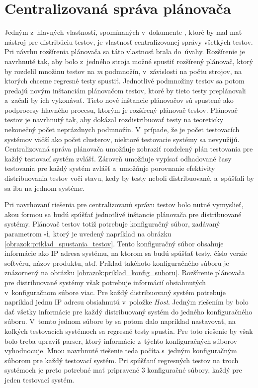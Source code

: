 \section{Centralizovaná správa plánovača}
\label{sekcia:centralizovana_sprava}
Jedným z~hlavných vlastností, spomínaných v~dokumente 
\cite{Parallel_approach},  ktoré by mal mať nástroj pre distribúciu 
testov, je vlastnosť  centralizovanej správy všetkých testov. 
Pri návrhu rozšírenia plánovača sa táto vlastnosť brala do~úvahy. 
Rozšírenie je navrhnuté tak, aby bolo z~jedného stroja možné spustiť 
rozšírený plánovač, ktorý by rozdelil množinu 
testov na \emph{m} podmnožín, v~závislosti na počtu strojov, na ktorých 
chceme regresné testy spustiť. Jednotlivé podmnožiny testov sa 
potom predajú novým inštanciám plánovačom testov, ktoré by tieto testy 
preplánovali a~začali by ich vykonávať. 
Tieto nové inštancie plánovačov sú spustené ako podprocesy hlavného procesu, 
ktorým je rozšírený plánovač testov.
Plánovač testov je navrhnutý tak, aby dokázal rozdistribuovať testy na 
teoreticky nekonečný počet neprázdnych podmnožín.
V~prípade, že je počet testovacích systémov väčší ako počet clusterov, 
niektoré testovacie systémy sa nevyužijú.
Centralizovaná správa plánovača umožňuje zobraziť rozdelený plán 
testovania pre každý testovací systém zvlášť. Zároveň umožňuje vypísať 
odhadované časy testovania pre každý systém zvlášť a~umožňuje porovnanie 
efektivity distribuovania testov voči stavu, kedy by testy neboli 
distribuované, a~spúšťali by sa iba na jednom systéme. 

Pri navrhovaní riešenia pre centralizovanú správu testov bolo nutné 
vymyslieť, akou formou sa budú spúšťať jednotlivé inštancie plánovača pre 
distribuované systémy. Plánovač testov totiž potrebuje konfiguračný súbor,
zadávaný parametrom \textbf{-i}, ktorý je uvedený napríklad na obrázku 
\ref{obrazok:priklad_spustania_testov}.
Tento konfiguračný súbor obsahuje informácie ako IP adresa systému, na ktorom sa 
budú spúšťať testy, číslo verzie softvéru, názov 
produktu, atď. Príklad takéhoto konfiguračného súboru je znázornený na 
obrázku \ref{obrazok:priklad_konfig_suboru}.
Rozšírenie plánovača pre distribuované systémy však potrebuje informácií 
obsiahnutých v~konfiguračnom súbore viac.
Pre každý distribuovaný systém potrebuje napríklad jednu IP adresu 
obsiahnutú v~položke \textit{Host}.
Jedným riešením by bolo dať všetky informácie pre každý distribuovaný 
systém do jedného konfiguračného súboru.
V~tomto jednom súbore by sa potom dalo napríklad nastavovať, na koľkých 
testovacích systémoch sa regresné testy spustia.
Pre toto riešenie by však bolo treba upraviť parser, ktorý informácie 
z~týchto konfiguračných súborov vyhodnocuje.
Mnou navrhnuté riešenie teda počíta s~jedným konfiguračným súborom pre 
každý testovací systém.
Pri spúšťaní regresných testov na troch systémoch je preto potrebné 
mať pripravené 3 konfiguračné súbory, každý pre jeden testovací systém. 

